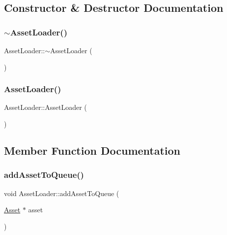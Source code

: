 \subsection{Constructor \& Destructor Documentation}
\hypertarget{class_asset_loader_a4f49d2d68ee1413e1f18dc7f4d003f0c}{}\label{class_asset_loader_a4f49d2d68ee1413e1f18dc7f4d003f0c} 
\subsubsection{\texorpdfstring{$\sim$\+Asset\+Loader()}{~AssetLoader()}}
{\footnotesize\ttfamily Asset\+Loader\+::$\sim$\+Asset\+Loader (\begin{DoxyParamCaption}{ }\end{DoxyParamCaption})}

\hypertarget{class_asset_loader_ae090ac88a0e6df2c7cc560da9f4c4f25}{}\label{class_asset_loader_ae090ac88a0e6df2c7cc560da9f4c4f25} 
\subsubsection{\texorpdfstring{Asset\+Loader()}{AssetLoader()}}
{\footnotesize\ttfamily Asset\+Loader\+::\+Asset\+Loader (\begin{DoxyParamCaption}{ }\end{DoxyParamCaption})\hspace{0.3cm}{\ttfamily [protected]}}



\subsection{Member Function Documentation}
\hypertarget{class_asset_loader_aaba5217d0cfe6203f3f47d3eb5dbe50c}{}\label{class_asset_loader_aaba5217d0cfe6203f3f47d3eb5dbe50c} 
\subsubsection{\texorpdfstring{add\+Asset\+To\+Queue()}{addAssetToQueue()}}
{\footnotesize\ttfamily void Asset\+Loader\+::add\+Asset\+To\+Queue (\begin{DoxyParamCaption}\item[{\hyperlink{struct_asset}{Asset} $\ast$}]{asset }\end{DoxyParamCaption})}


